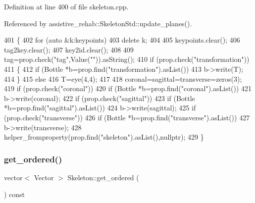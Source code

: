 Definition at line 400 of file skeleton.\+cpp.



Referenced by assistive\+\_\+rehab\+::\+Skeleton\+Std\+::update\+\_\+planes().


\begin{DoxyCode}
401 \{
402     \textcolor{keywordflow}{for} (\textcolor{keyword}{auto} &k:keypoints)
403         \textcolor{keyword}{delete} k;
404 
405     keypoints.clear();
406     tag2key.clear();
407     key2id.clear();
408 
409     tag=prop.check(\textcolor{stringliteral}{"tag"},Value(\textcolor{stringliteral}{""})).asString();
410     \textcolor{keywordflow}{if} (prop.check(\textcolor{stringliteral}{"transformation"}))
411     \{
412         \textcolor{keywordflow}{if} (Bottle *b=prop.find(\textcolor{stringliteral}{"transformation"}).asList())
413             b->write(T);
414     \}
415     \textcolor{keywordflow}{else}
416         T=eye(4,4);
417 
418     coronal=sagittal=transverse=zeros(3);
419     \textcolor{keywordflow}{if} (prop.check(\textcolor{stringliteral}{"coronal"}))
420         \textcolor{keywordflow}{if} (Bottle *b=prop.find(\textcolor{stringliteral}{"coronal"}).asList())
421             b->write(coronal);
422     \textcolor{keywordflow}{if} (prop.check(\textcolor{stringliteral}{"sagittal"}))
423         \textcolor{keywordflow}{if} (Bottle *b=prop.find(\textcolor{stringliteral}{"sagittal"}).asList())
424             b->write(sagittal);
425     \textcolor{keywordflow}{if} (prop.check(\textcolor{stringliteral}{"transverse"}))
426         \textcolor{keywordflow}{if} (Bottle *b=prop.find(\textcolor{stringliteral}{"transverse"}).asList())
427             b->write(transverse);
428     helper\_fromproperty(prop.find(\textcolor{stringliteral}{"skeleton"}).asList(),\textcolor{keyword}{nullptr});
429 \}
\end{DoxyCode}
\mbox{\label{classassistive__rehab_1_1Skeleton_a9c56f7f9e243ae2c4c3fef6dbb051dc2}} 
\subsubsection{\texorpdfstring{get\+\_\+ordered()}{get\_ordered()}}
{\footnotesize\ttfamily vector$<$ Vector $>$ Skeleton\+::get\+\_\+ordered (\begin{DoxyParamCaption}{ }\end{DoxyParamCaption}) const\hspace{0.3cm}{\ttfamily [virtual]}}



